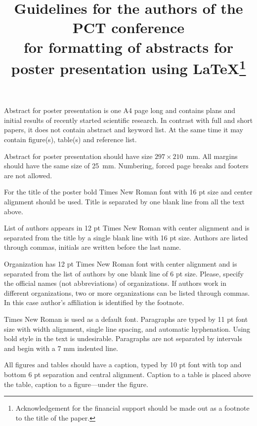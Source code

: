 \documentclass[11pt, oneside, a4paper]{article}
\begin{document}

\title{Guidelines for the authors of the PCT conference\\
for formatting of abstracts for poster presentation
using \LaTeX\footnote{Acknowledgement for the financial support should be made out as a footnote to the title of the paper.}}


Abstract for poster presentation is one A4 page long and contains plans and initial results of recently started scientific research. In contrast with full and short papers, it does not contain abstract and keyword list. At the same time it may contain figure(s), table(s) and reference list.

Abstract for poster presentation should have size $297 \times 210$~mm. All margins should have the same size of 25~mm. Numbering, forced page breaks and footers are not allowed.

For the title of the poster bold Times New Roman font with 16 pt size and center alignment should be used. Title is separated by one blank line from all the text above.

List of authors appears in 12 pt Times New Roman with center alignment and is separated from the title by a single blank line with 16 pt size. Authors are listed through commas, initials are written before the last name. 

Organization has 12 pt Times New Roman font with center alignment and is separated from the list of authors by one blank line of 6 pt size. Please, specify the official names (not abbreviations) of organizations. If authors work in different organizations, two or more organizations can be listed through commas. In this case author's affiliation is identified by the footnote. 

Times New Roman is used as a default font. Paragraphs are typed by 11 pt font size with width alignment, single line spacing, and automatic hyphenation. Using bold style in the text is undesirable. Paragraphs are not separated by intervals and begin with a 7 mm indented line. 

All figures and tables should have a caption, typed by 10 pt font with top and bottom 6 pt separation and central alignment. Caption to a table is placed above the table, caption to a figure---under the figure. 
\end{document}
